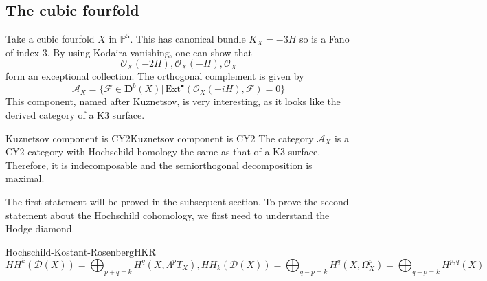 



\subsection{The cubic fourfold}

Take a cubic fourfold $X$ in $\mathbb{P}^5$. This has canonical bundle $K_{X}=-3H$ so is a Fano of index 3. By using Kodaira vanishing, one can show that $$\mathcal{O}_{X}(-2H), \mathcal{O}_{X}(-H), \mathcal{O}_{X}$$form an exceptional collection. The orthogonal complement is given by $$\mathcal{A}_{X}=\{\mathcal{F}\in \mathbf{D}^b(X)|\,\mathrm{Ext}^\bullet(\mathcal{O}_{X}(-iH), \mathcal{F})=0\}$$This component, named after Kuznetsov, is very interesting, as it looks like the derived category of a K3 surface.

\begin{proposition}{Kuznetsov component is CY2}{Kuznetsov component is CY2}
The category $\mathcal{A}_{X}$ is a CY2 category with Hochschild homology the same as that of a K3 surface. Therefore, it is indecomposable and the semiorthogonal decomposition is maximal.
\end{proposition}

The first statement will be proved in the subsequent section. To prove the second statement about the Hochschild cohomology, we first need to understand the Hodge diamond.

\begin{theorem}{Hochschild-Kostant-Rosenberg}{HKR}
    $$HH^k(\mathcal{D}(X))=\bigoplus_{p+q=k} H^q(X, \Lambda^p T_X), HH_k(\mathcal{D}(X))=\bigoplus_{q-p=k} H^q(X, \Omega^p_X)=\bigoplus_{q-p=k} H^{p,q}(X)$$
    
\end{theorem}

